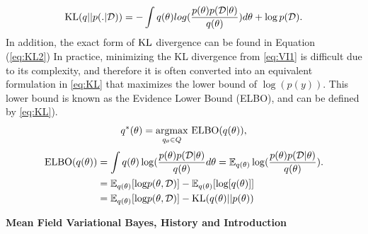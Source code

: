 \begin{equation}
	\label{eq:KL2}
	\textnormal{KL}(q||p(.|\mathcal{D})) = - \int q(\theta)log(\frac{p(\theta)p(\mathcal{D}|\theta)}{q(\theta)}) d\theta + \log p(\mathcal{D}).
\end{equation}
In addition, the exact form of $\textnormal{KL}$ divergence can be found in Equation (\ref{eq:KL2})
In practice, minimizing the KL divergence from \autoref{eq:VI1} is difficult due to its complexity, and therefore it is often converted into an equivalent formulation in \autoref{eq:KL} that maximizes the lower bound of $\log(p(y))$. This lower bound is known as the Evidence Lower Bound (ELBO), and can be defined by \autoref{eq:KL}).
\begin{equation}
	\label{eq:KL}
	q^*(\theta) = \underset{q_{\theta} \in Q}{\operatorname{ argmax}} \textnormal{ ELBO}(q(\theta)),
\end{equation}
\begin{equation}
	\label{eq:ELBO}	
	\begin{aligned}
	\textnormal{ELBO}(q(\theta)) &= \int q(\theta)\log(\frac{p(\theta)p(\mathcal{D}|\theta)}{q(\theta)}d\theta = \mathop{\mathbb{E}_{q(\theta)}}\log(\frac{p(\theta)p(\mathcal{D}|\theta)}{q(\theta)}).\\
	& = \mathop{\mathbb{E}_{q(\theta)}}[\textnormal{log}p(\theta,\mathcal{D})]
	- \mathop{\mathbb{E}_{q(\theta)}}[\textnormal{log}[q(\theta)]]\\
	&= \mathop{\mathbb{E}_{q(\theta)}}[\textnormal{log}p(\theta,\mathcal{D})]
	- \textnormal{KL}(q(\theta)||p(\theta))\\
	\end{aligned}
\end{equation}

\textbf{Mean Field Variational Bayes, History and Introduction}

